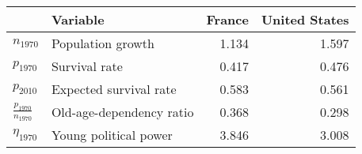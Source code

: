 
\begin{tabular}{llrr}
\toprule
\textbf{} & \textbf{Variable} & \textbf{France} & \textbf{United States}\\
\midrule
$n_{1970}$ & Population growth & 1.134 & 1.597\\
$p_{1970}$ & Survival rate & 0.417 & 0.476\\
$p_{2010}$ & Expected survival rate & 0.583 & 0.561\\
$\frac{p_{1970}}{n_{1970}}$ & Old-age-dependency ratio & 0.368 & 0.298\\
$\eta_{1970}$ & Young political power & 3.846 & 3.008\\
\bottomrule
\end{tabular}
